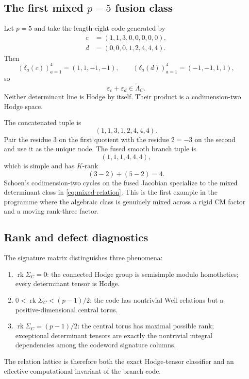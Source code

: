 \documentclass[11pt]{article}
\theoremstyle{definition}
\theoremstyle{remark}
\newcommand{\eps}{\varepsilon}
\newcommand{\rk}{\operatorname{rk}}
\begin{document}
\subsection{The first mixed \texorpdfstring{$p=5$}{p=5} fusion class}

Let $p=5$ and take the length-eight code generated by
\begin{align*}
 c&=(1,1,3,0,0,0,0,0),\\
 d&=(0,0,0,1,2,4,4,4).
\end{align*}
Then
\[
 (\delta_a(c))_{a=1}^4=(1,1,-1,-1),
 \qquad
 (\delta_a(d))_{a=1}^4=(-1,-1,1,1),
\]
so
\begin{equation}\label{eq:mixed-relation}
 \eps_c+\eps_d\in\widetilde\Lambda_C.
\end{equation}
Neither determinant line is Hodge by itself.  Their product is a codimension-two Hodge space.

The concatenated tuple is
\[
 (1,1,3,1,2,4,4,4).
\]
Pair the residue $3$ on the first quotient with the residue $2=-3$ on the second and use it as the unique node.  The fused smooth branch tuple is
\[
 (1,1,1,4,4,4),
\]
which is simple and has $K$-rank
\[
 (3-2)+(5-2)=4.
\]
Schoen's codimension-two cycles on the fused Jacobian specialize to the mixed determinant class in \eqref{eq:mixed-relation}.  This is the first example in the programme where the algebraic class is genuinely mixed across a rigid CM factor and a moving rank-three factor.

\subsection{Rank and defect diagnostics}

The signature matrix distinguishes three phenomena:
\begin{enumerate}
\item $\rk\Sigma_C=0$: the connected Hodge group is semisimple modulo homotheties; every determinant tensor is Hodge.
\item $0<\rk\Sigma_C<(p-1)/2$: the code has nontrivial Weil relations but a positive-dimensional central torus.
\item $\rk\Sigma_C=(p-1)/2$: the central torus has maximal possible rank; exceptional determinant tensors are exactly the nontrivial integral dependencies among the codeword signature columns.
\end{enumerate}
The relation lattice is therefore both the exact Hodge-tensor classifier and an effective computational invariant of the branch code.
\end{document}
